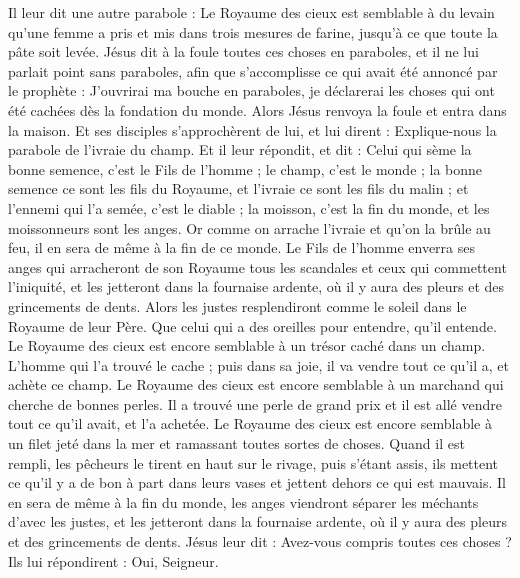 \begin{multicols}{2}
Il leur dit une autre parabole : Le Royaume des cieux est semblable à du levain qu'une femme a pris et mis dans trois mesures de farine, jusqu'à ce que toute la pâte soit levée.
Jésus dit à la foule toutes ces choses en paraboles, et il ne lui parlait point sans paraboles,
afin que s'accomplisse ce qui avait été annoncé par le prophète : J'ouvrirai ma bouche en paraboles, je déclarerai les choses qui ont été cachées dès la fondation du monde.
Alors Jésus renvoya la foule et entra dans la maison. Et ses disciples s'approchèrent de lui, et lui dirent : Explique-nous la parabole de l'ivraie du champ.
Et il leur répondit, et dit : Celui qui sème la bonne semence, c'est le Fils de l'homme ;
le champ, c'est le monde ; la bonne semence ce sont les fils du Royaume, et l'ivraie ce sont les fils du malin ;
et l'ennemi qui l'a semée, c'est le diable ; la moisson, c'est la fin du monde, et les moissonneurs sont les anges.
Or comme on arrache l'ivraie et qu'on la brûle au feu, il en sera de même à la fin de ce monde.
Le Fils de l'homme enverra ses anges qui arracheront de son Royaume tous les scandales et ceux qui commettent l'iniquité,
et les jetteront dans la fournaise ardente, où il y aura des pleurs et des grincements de dents.
Alors les justes resplendiront comme le soleil dans le Royaume de leur Père. Que celui qui a des oreilles pour entendre, qu'il entende.
Le Royaume des cieux est encore semblable à un trésor caché dans un champ. L'homme qui l'a trouvé le cache ; puis dans sa joie, il va vendre tout ce qu'il a, et achète ce champ.
Le Royaume des cieux est encore semblable à un marchand qui cherche de bonnes perles.
Il a trouvé une perle de grand prix et il est allé vendre tout ce qu'il avait, et l'a achetée.
Le Royaume des cieux est encore semblable à un filet jeté dans la mer et ramassant toutes sortes de choses.
Quand il est rempli, les pêcheurs le tirent en haut sur le rivage, puis s'étant assis, ils mettent ce qu'il y a de bon à part dans leurs vases et jettent dehors ce qui est mauvais.
Il en sera de même à la fin du monde, les anges viendront séparer les méchants d'avec les justes,
et les jetteront dans la fournaise ardente, où il y aura des pleurs et des grincements de dents.
Jésus leur dit : Avez-vous compris toutes ces choses ? Ils lui répondirent : Oui, Seigneur.

\end{multicols}
